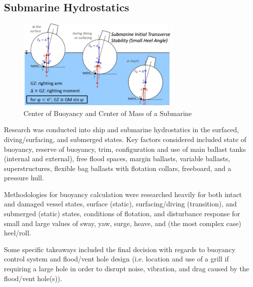 \documentclass{report}
\begin{document}
\subsection{Submarine Hydrostatics}
\begin{figure}[h]
\centering
\includegraphics[width=8cm]{"Submarine Hydrostatics"}
\caption{Center of Buoyancy and Center of Mass of a Submarine}
\end{figure}
Research was conducted into ship and submarine hydrostatics in the surfaced, diving/surfacing, and submerged states.  Key factors considered included state of buoyancy, reserve of buoyancy, trim, configuration and use of main ballast tanks (internal and external), free flood spaces, margin ballasts, variable ballasts, superstructures, flexible bag ballasts with flotation collars, freeboard, and a pressure hull.\par
\indent Methodologies for buoyancy calculation were researched heavily for both intact and damaged vessel states, surface (static), surfacing/diving (transition), and submerged (static) states, conditions of flotation, and disturbance response for small and large values of sway, yaw, surge, heave, and (the most complex case) heel/roll.\par
\indent Some specific takeaways included the final decision with regards to buoyancy control system and flood/vent hole design (i.e. location and use of a grill if requiring a large hole in order to disrupt noise, vibration, and drag caused by the flood/vent hole(s)).
\end{document}

